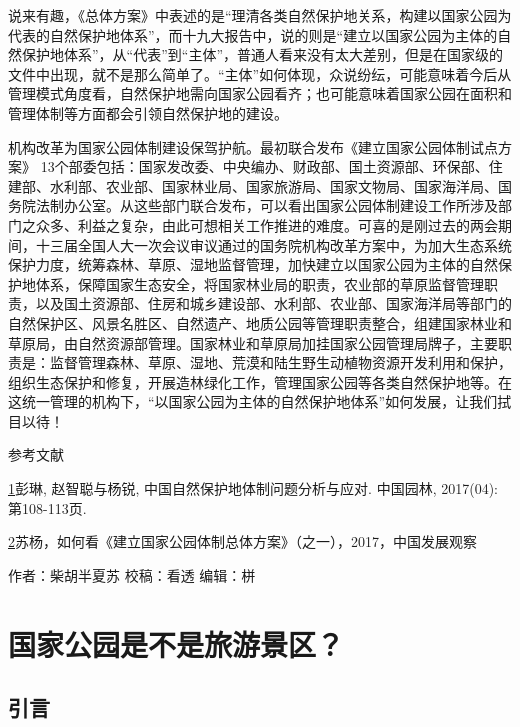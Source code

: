 \documentclass[]{book}
\begin{document}
说来有趣，《总体方案》中表述的是``理清各类自然保护地关系，构建以国家公园为代表的自然保护地体系''，而十九大报告中，说的则是``建立以国家公园为主体的自然保护地体系''，从``代表''到``主体''，普通人看来没有太大差别，但是在国家级的文件中出现，就不是那么简单了。``主体''如何体现，众说纷纭，可能意味着今后从管理模式角度看，自然保护地需向国家公园看齐；也可能意味着国家公园在面积和管理体制等方面都会引领自然保护地的建设。

机构改革为国家公园体制建设保驾护航。最初联合发布《建立国家公园体制试点方案》 13个部委包括：国家发改委、中央编办、财政部、国土资源部、环保部、住建部、水利部、农业部、国家林业局、国家旅游局、国家文物局、国家海洋局、国务院法制办公室。从这些部门联合发布，可以看出国家公园体制建设工作所涉及部门之众多、利益之复杂，由此可想相关工作推进的难度。可喜的是刚过去的两会期间，十三届全国人大一次会议审议通过的国务院机构改革方案中，为加大生态系统保护力度，统筹森林、草原、湿地监督管理，加快建立以国家公园为主体的自然保护地体系，保障国家生态安全，将国家林业局的职责，农业部的草原监督管理职责，以及国土资源部、住房和城乡建设部、水利部、农业部、国家海洋局等部门的自然保护区、风景名胜区、自然遗产、地质公园等管理职责整合，组建国家林业和草原局，由自然资源部管理。国家林业和草原局加挂国家公园管理局牌子，主要职责是：监督管理森林、草原、湿地、荒漠和陆生野生动植物资源开发利用和保护，组织生态保护和修复，开展造林绿化工作，管理国家公园等各类自然保护地等。在这统一管理的机构下，``以国家公园为主体的自然保护地体系''如何发展，让我们拭目以待！

参考文献

\href{陈心想，耿增超。西北农林科技大学学报（自然科学版），2013，41:\%20167-174．}{1}彭琳, 赵智聪与杨锐, 中国自然保护地体制问题分析与应对. 中国园林, 2017(04): 第108-113页.

\href{Kezhen\%20Qian,\%20Ajay\%20Kumar,\%20et.al.\%20Renew.\%20and\%20Sustain.\%20Energy\%20Reviews,\%202015,\%2042:\%201055-1064.}{2}苏杨，如何看《建立国家公园体制总体方案》（之一），2017，中国发展观察

作者：柴胡半夏苏
校稿：看透
编辑：栟

\hypertarget{ux56fdux5bb6ux516cux56edux662fux4e0dux662fux65c5ux6e38ux666fux533a}{%
\section{国家公园是不是旅游景区？}\label{ux56fdux5bb6ux516cux56edux662fux4e0dux662fux65c5ux6e38ux666fux533a}}

\hypertarget{ux5f15ux8a00}{%
\subsection{引言}\label{ux5f15ux8a00}}
\end{document}
